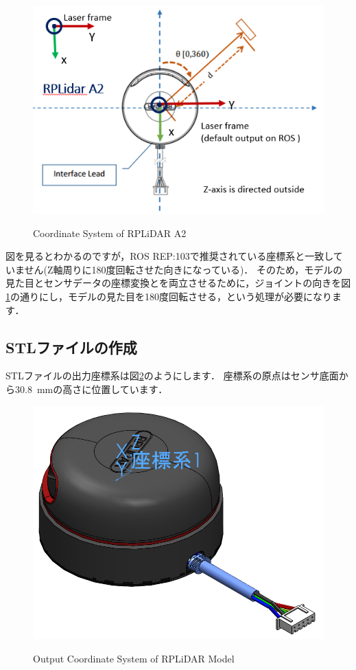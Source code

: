 \documentclass[{../../master}]{subfiles}
\begin{document}
\begin{figure}[ht]
  \centering
  \includegraphics[width=100truemm]{images/rplidar_a2_coordinate_system.png}
  \label{fig:rplidar_a2_coordinate_system}
  \caption{Coordinate System of RPLiDAR A2}
\end{figure}

図を見るとわかるのですが，ROS REP:103で推奨されている座標系と一致していません(Z軸周りに180度回転させた向きになっている)．
そのため，モデルの見た目とセンサデータの座標変換とを両立させるために，ジョイントの向きを図\ref{fig:rplidar_a2_coordinate_system}の通りにし，モデルの見た目を180度回転させる，という処理が必要になります．

\subsection{STLファイルの作成}

STLファイルの出力座標系は図\ref{fig:lidar_link_coordinate}のようにします．
座標系の原点はセンサ底面から\SI{30.8}{mm}の高さに位置しています．

\begin{figure}[ht]
  \centering
  \includegraphics[height=40truemm]{images/lidar_link_coordinate.png}
  \label{fig:lidar_link_coordinate}
  \caption{Output Coordinate System of RPLiDAR Model}
\end{figure}
\end{document}
